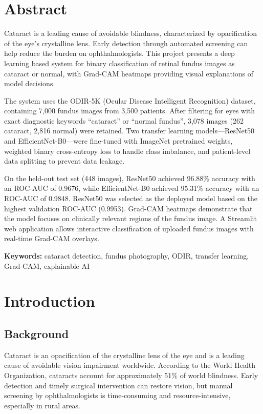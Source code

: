 \documentclass[12pt, a4paper]{article}
\begin{document}
\section{Abstract}

Cataract is a leading cause of avoidable blindness, characterized by opacification of the eye's crystalline lens. Early detection through automated screening can help reduce the burden on ophthalmologists. This project presents a deep learning based system for binary classification of retinal fundus images as cataract or normal, with Grad-CAM heatmaps providing visual explanations of model decisions.

The system uses the ODIR-5K (Ocular Disease Intelligent Recognition) dataset, containing 7,000 fundus images from 3,500 patients. After filtering for eyes with exact diagnostic keywords ``cataract'' or ``normal fundus'', 3,078 images (262 cataract, 2,816 normal) were retained. Two transfer learning models—ResNet50 and EfficientNet-B0—were fine-tuned with ImageNet pretrained weights, weighted binary cross-entropy loss to handle class imbalance, and patient-level data splitting to prevent data leakage.

On the held-out test set (448 images), ResNet50 achieved 96.88\% accuracy with an ROC-AUC of 0.9676, while EfficientNet-B0 achieved 95.31\% accuracy with an ROC-AUC of 0.9848. ResNet50 was selected as the deployed model based on the highest validation ROC-AUC (0.9953). Grad-CAM heatmaps demonstrate that the model focuses on clinically relevant regions of the fundus image. A Streamlit web application allows interactive classification of uploaded fundus images with real-time Grad-CAM overlays.

\textbf{Keywords:} cataract detection, fundus photography, ODIR, transfer learning, Grad-CAM, explainable AI

\section{Introduction}

\subsection{Background}
Cataract is an opacification of the crystalline lens of the eye and is a leading cause of avoidable vision impairment worldwide. According to the World Health Organization, cataracts account for approximately 51\% of world blindness. Early detection and timely surgical intervention can restore vision, but manual screening by ophthalmologists is time-consuming and resource-intensive, especially in rural areas.
\end{document}
